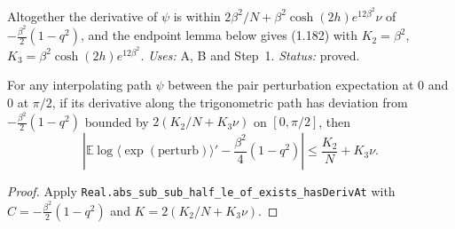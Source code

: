 Altogether the derivative of $\psi$ is within $2\beta^2/N+\beta^2\cosh(2h)e^{12\beta^2}\nu$ of
$-\tfrac{\beta^2}{2}(1-q^2)$, and the endpoint lemma below gives (1.182) with
$K_2=\beta^2$, $K_3=\beta^2\cosh(2h)e^{12\beta^2}$.
\emph{Uses:} A, B and Step~1.  \emph{Status:} proved.

\begin{theorem}
\label{thm:sg-tal:pair-perturb-estimate}
  \leanok
{}
For any interpolating path $\psi$ between the pair perturbation expectation at $0$ and $0$ at $\pi / 2$,
if its derivative along the trigonometric path has deviation from $-\frac{\beta^2}{2}(1-q^2)$ bounded by
$2 (K_2 / N + K_3 \nu)$ on $[0, \pi/2]$, then
\[
  \left|\mathbb E \log \langle \exp(\text{perturb}) \rangle' - \frac{\beta^2}{4}(1-q^2)\right| \le \frac{K_2}{N} + K_3 \nu.
\]
\end{theorem}
\begin{proof}
  \leanok
Apply \texttt{Real.abs\_sub\_sub\_half\_le\_of\_exists\_hasDerivAt} with $C = -\frac{\beta^2}{2}(1-q^2)$ and $K = 2(K_2/N + K_3 \nu)$.
\end{proof}

